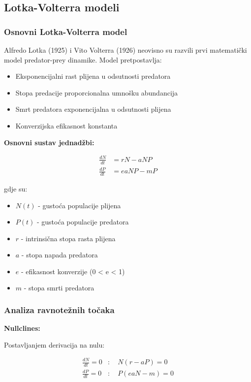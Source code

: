 \documentclass[11pt,oneside]{book}
\begin{document}
\subsection{Lotka-Volterra modeli}

\subsubsection{Osnovni Lotka-Volterra model}

Alfredo Lotka (1925) i Vito Volterra (1926) neovisno su razvili prvi matematički model predator-prey dinamike. Model pretpostavlja:

\begin{itemize}
	\item Eksponencijalni rast plijena u odsutnosti predatora
	\item Stopa predacije proporcionalna umnošku abundancija
	\item Smrt predatora exponencijalna u odsutnosti plijena
	\item Konverzijska efikasnost konstanta
\end{itemize}

\textbf{Osnovni sustav jednadžbi:}

\begin{align}
	\frac{dN}{dt} &= rN - aNP \label{eq:lv-prey} \\
	\frac{dP}{dt} &= eaNP - mP \label{eq:lv-predator}
\end{align}

gdje su:
\begin{itemize}
	\item $N(t)$ - gustoća populacije plijena
	\item $P(t)$ - gustoća populacije predatora  
	\item $r$ - intrinsična stopa rasta plijena
	\item $a$ - stopa napada predatora
	\item $e$ - efikasnost konverzije (0 < e < 1)
	\item $m$ - stopa smrti predatora
\end{itemize}

\subsubsection{Analiza ravnotežnih točaka}

\textbf{Nullclines:}

Postavljanjem derivacija na nulu:

\begin{align}
	\frac{dN}{dt} = 0 &: \quad N(r - aP) = 0 \\
	\frac{dP}{dt} = 0 &: \quad P(eaN - m) = 0
\end{align}
\end{document}

